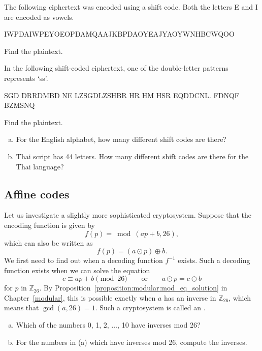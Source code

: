\begin{exercise}{}  
The following ciphertext was encoded using a shift code. Both the letters E and I are encoded as vowels. 

IWPDAIWPEYOEOPDAMQAAJKBPDAOYEAJYAOYWNHBCWQOO

\noindent
Find the plaintext.
\end{exercise}

\begin{exercise}{}  
In the following shift-coded ciphertext,  one of the double-letter patterns represents `ss'. 

SGD DRRDMBD NE LZSGDLZSHBR HR HM HSR EQDDCNL. FDNQF BZMSNQ

\noindent
Find the plaintext.
\end{exercise}

\begin{exercise}{}  
\begin{enumerate}[(a)]
\item
For the English alphabet, how many different shift codes are there?
\item
Thai script has 44 letters. How many different shift codes are there for the Thai language?
\end{enumerate}
\end{exercise}


\subsection{Affine codes}
 
Let us investigate a slightly more sophisticated cryptosystem. Suppose
that the encoding function is given by  
$$
f(p) = \bmod(ap + b,  26),
$$
which can also be written as
$$
f(p) = (a \odot p) \oplus b.
$$
We first need to find out when a decoding function $f^{-1}$ exists.
Such a decoding function exists when we can solve the equation
$$
c \equiv ap + b \pmod{26}\qquad \textrm{or}\qquad a \odot p = c \ominus  b
$$
for $p$ in $\mathbb{Z}_{26}$. By Proposition~\ref{proposition:modular:mod_eq_solution} in Chapter~\ref{modular}, this is possible exactly when $a$ has an
inverse in $\mathbb{Z}_{26}$, which means that $\gcd( a, 26) =1$. 
Such a cryptosystem is called an . 
 
\begin{exercise}{}
\begin{enumerate}[(a)]
\item
Which of the numbers 0, 1, 2, $\dots$, 10 have inverses mod 26?
\item
For the numbers in (a) which have inverses mod 26, compute the inverses.
\end{enumerate}
\end{exercise}



